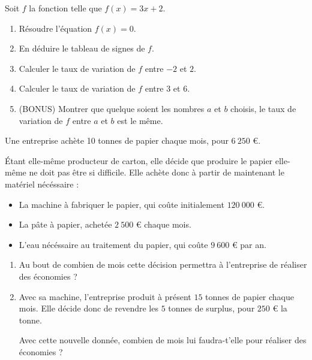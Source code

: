 \documentclass[
	classe=1 STI2D,
	gray,
	surFeuille,
	headerTitle=Évaluation\space Chapitre\space 2
]{évaluation}
\begin{document}
\begin{exercice}
	Soit $f$ la fonction telle que $f(x) = 3x + 2$.

	\begin{enumerate}
		\item Résoudre l'équation $f(x) = 0$.
		\item En déduire le tableau de signes de $f$.
		\item Calculer le taux de variation de $f$ entre $-2$ et $2$.
		\item Calculer le taux de variation de $f$ entre $3$ et $6$.
		\item (BONUS) Montrer que quelque soient les nombres $a$ et $b$ choisis, le taux de variation de $f$ entre $a$ et $b$ est le même.
	\end{enumerate}
\end{exercice}

\begin{exercice}
	Une entreprise achète 10 tonnes de papier chaque mois, pour $6\ 250$ €. \smallskip

	Étant elle-même producteur de carton, elle décide que produire le papier elle-même ne doit pas être si difficile. Elle achète donc à partir de maintenant le matériel nécéssaire :

	\begin{itemize}
		\item La machine à fabriquer le papier, qui coûte initialement $120\ 000$ €.
		\item La pâte à papier, achetée $2\ 500$ € chaque mois.
		\item L'eau nécéssaire au traitement du papier, qui coûte $9\ 600$ € par an.
	\end{itemize}

	\begin{enumerate}
		\item Au bout de combien de mois cette décision permettra à l'entreprise de réaliser des économies ?
		\item Avec sa machine, l'entreprise produit à présent $15$ tonnes de papier chaque mois. Elle décide donc de revendre les $5$ tonnes de surplus, pour $250$ € la tonne.

		      Avec cette nouvelle donnée, combien de mois lui faudra-t'elle pour réaliser des économies ?
	\end{enumerate}
\end{exercice}
\end{document}
